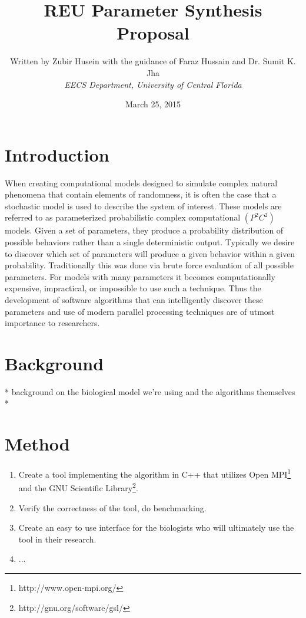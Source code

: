 \documentclass[a4paper,10pt]{article}
\begin{document}
\title{\vspace{-1.0cm}REU Parameter Synthesis Proposal}
\date{\small March 25, 2015}
\author{\small Written by Zubir Husein with the guidance of Faraz Hussain and Dr. Sumit K. Jha
	\\\em \small EECS Department, University of Central Florida}
\maketitle

\section*{Introduction}

When creating computational models designed to simulate complex natural phenomena that contain elements of randomness, it is often the case that a stochastic model is used to describe the system of interest. 
These models are referred to as parameterized probabilistic complex computational $(P^2C^2)$ models.
Given a set of parameters, they produce a probability distribution of possible behaviors
rather than a single deterministic output. Typically we desire to discover which set of parameters will produce a given behavior within a given probability. Traditionally this was done via brute force evaluation of all possible parameters. 
For models with many parameters it becomes computationally expensive, impractical, or impossible to use such a technique.
Thus the development of software algorithms that can intelligently discover these parameters and use of modern parallel processing techniques are of utmost importance to researchers. 

\section*{Background}

* background on the biological model we're using and the algorithms themselves *


\section*{Method}
\begin{enumerate}
	\item Create a tool implementing the algorithm in C++ that utilizes Open MPI\footnote{http://www.open-mpi.org/} and the GNU Scientific Library\footnote{http://gnu.org/software/gsl/}.
	\item Verify the correctness of the tool, do benchmarking.
	\item Create an easy to use interface for the biologists who will ultimately use the tool in their research.
	\item ...
\end{enumerate}
\end{document}
